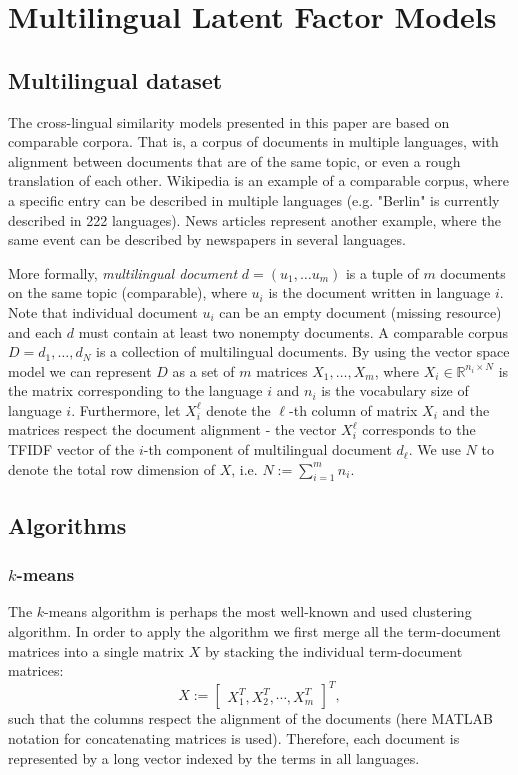 \documentclass[twoside,11pt]{article}
\newcommand{\RR}{\mathbb{R}}
\begin{document}
\section{Multilingual Latent Factor Models}\label{sec:models}

\subsection{Multilingual dataset}

The cross-lingual similarity models presented in this paper are based on comparable corpora. That is, a corpus of documents in multiple languages, with alignment between documents that are of the same topic, or even a rough translation of each other. Wikipedia is an example of a comparable corpus, where a specific entry can be described in multiple languages (e.g. "Berlin" is currently described in 222 languages). News articles represent another example, where the same event can be described by newspapers in several languages.

More formally, \emph{multilingual document} $d = (u_1,\ldots u_m)$ is a tuple of $m$ documents on the same topic (comparable), where $u_i$ is the document written in language $i$. Note that individual document $u_i$ can be an empty document (missing resource) and each $d$ must contain at least two nonempty documents. A comparable corpus $D = {d_1, \ldots, d_N}$ is a collection of multilingual documents. By using the vector space model we can represent $D$ as a set of $m$ matrices $X_1,\ldots,X_m$, where $X_i \in \RR^{n_i \times N}$ is the matrix corresponding to the language $i$ and $n_i$ is the vocabulary size of language $i$. Furthermore, let $X_i^{\ell}$ denote the $\ell$-th column of matrix $X_i$ and the matrices respect the document alignment - the vector $X_i^\ell$ corresponds to the TFIDF vector of the $i$-th component of multilingual document $d_\ell$. We use $N$ to denote the total row dimension of $X$, i.e. $N:= \sum_{i=1}^m n_i$.


\subsection{Algorithms}

\subsubsection{$k$-means}

The $k$-means algorithm is perhaps the most well-known and used clustering algorithm. In order to apply the algorithm we first merge all the term-document matrices into a single matrix $X$ by stacking the individual term-document matrices:
$$X := \begin{bmatrix}X_1^T ,X_2^T, \cdots, X_m^T \end{bmatrix}^T,$$
such that the columns respect the alignment of the documents (here MATLAB notation for concatenating matrices is used). Therefore, each document  is represented by a long vector indexed by the terms in all languages.
\end{document}
